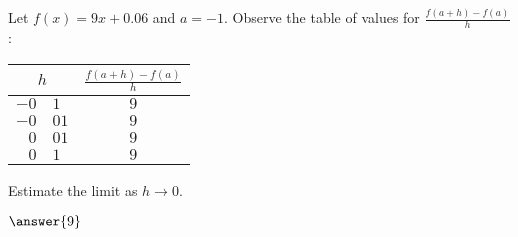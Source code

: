 \documentclass{ximera}
\author{Gregory Hartman \and Matthew Carr}
\begin{document}
\begin{exercise}







Let $f(x) = 9x+0.06$ and $a=-1$. Observe the table of values for $\frac{f(a+h)-f({a})}{h}$:
\begin{center}
 \begin{tabular}{r@{.}lc}
  \multicolumn{2}{c}{$h$} & $\frac{f(a+h)-f({a})}{h}$\\ \hline 
  $-0$ & $1$ & $9$ \\
  $-0$ & $01$ & $9$ \\
  $0$ & $01$ & $9$ \\
  $0$ & $1$ & $9$
 \end{tabular}
\end{center}
Estimate the limit as $h\to 0$. \begin{prompt}$\answer{9}$
\end{prompt}

\end{exercise}
\end{document}
